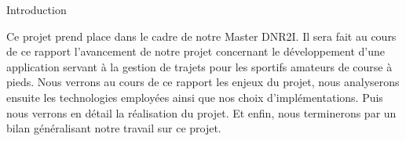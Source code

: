 {\Huge{Introduction}}

\vspace{2.5cm}
Ce projet prend place dans le cadre de notre Master DNR2I. Il sera fait au cours de ce rapport l'avancement de notre projet concernant le développement d'une application servant à la gestion de trajets pour les sportifs amateurs de course à pieds. Nous verrons au cours de ce rapport les enjeux du projet, nous analyserons ensuite les technologies employées ainsi que nos choix d'implémentations. Puis nous verrons en détail la réalisation du projet. Et enfin, nous terminerons par un bilan généralisant notre travail sur ce projet.